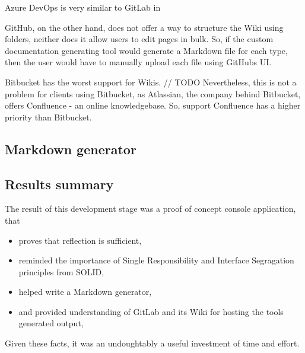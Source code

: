 Azure DevOps is very similar to GitLab in 

GitHub, on the other hand, does not offer a way to structure the Wiki using folders, neither does it allow users to edit pages in bulk. So, if the custom documentation generating tool would generate a Markdown file for each type, then the user would have to manually upload each file using GitHubs UI.

Bitbucket has the worst support for Wikis.
// TODO
Nevertheless, this is not a problem for clients using Bitbucket, as Atlassian, the company behind Bitbucket, offers Confluence - an online knowledgebase. So, support Confluence has a higher priority than Bitbucket.

\subsection{Markdown generator}

\subsection{Results summary}

The result of this development stage was a proof of concept console application, that
\begin{itemize}
    \item proves that reflection is sufficient,
    \item reminded the importance of Single Responsibility and Interface Segragation principles from SOLID,
    \item helped write a Markdown generator,
    \item and provided understanding of GitLab and its Wiki for hosting the tools generated output,
\end{itemize}

Given these facts, it was an undoughtably a useful investment of time and effort.
